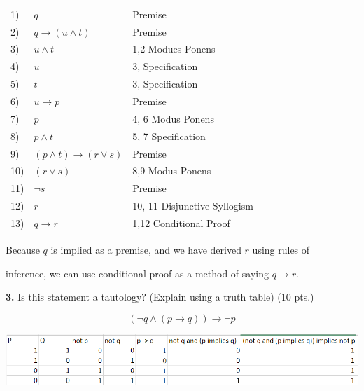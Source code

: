 \documentclass{article} %
\begin{document}
    \begin{tabular}{ l l l }
        1) & $q$ & Premise \\

        2) & $q \rightarrow (u \land t)$  & Premise \\

        3) & $u \land t$            & 1,2 Modues Ponens \\

        4) & $u$                & 3, Specification \\

        5) & $t$                 & 3, Specification \\

        6) & $u \rightarrow p$         & Premise \\

        7) & $p$              & 4, 6 Modus Ponens \\

        8) & $p \land t$       & 5, 7 Specification \\

        9) & $(p \land t) \rightarrow (r \lor s)$    & Premise \\ 

        10) & $(r \lor s)$ & 8,9 Modus Ponens \\ 

        11) & $\neg s$           & Premise \\ 

        12) & $r$              & 10, 11 Disjunctive Syllogism \\ 
        
        13) & $q \rightarrow r$ & 1,12 Conditional Proof \\
    \end{tabular}

    Because $q$ is implied as a premise, and we have derived $r$ using rules of 
    
    inference, we can use conditional proof as a method of saying $q \rightarrow r$.   


    \newpage

    \textbf{3.} Is this statement a tautology? (Explain using a truth table) (10 pts.)
    
    $$(\neg q \land (p \rightarrow q)) \rightarrow \neg p$$

    \includegraphics[scale=0.9]{figure1.png}
\end{document}

